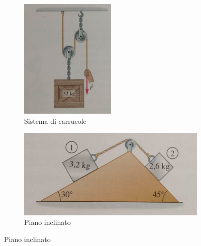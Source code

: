 \documentclass[14pt]{extarticle}
\begin{document}
\begin{figure}[b!]
\centering
\begin{subfigure}{.5\textwidth}
  \centering
  \includegraphics[width=1.8in]{pictures/problemaCarrucole.png}
  \caption{Sistema di carrucole}
  \label{fig:carrucole}
\end{subfigure}%
\begin{subfigure}{.5\textwidth}
  \centering
  \includegraphics[width=3.8in]{pictures/problemaPianoInclinato.jpg}
  \caption{Piano inclinato}
  \label{fig:pianoInclinato}
\end{subfigure}
\label{fig:test}
\end{figure}
\end{document}
